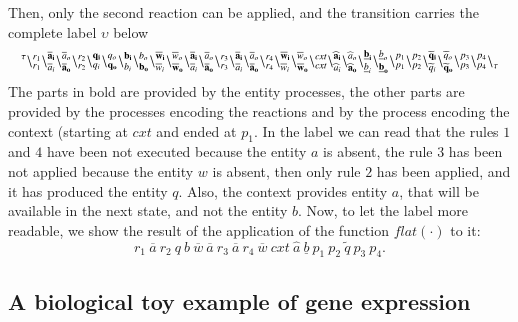 Then, only the second reaction can be applied, and the transition carries the complete label $\upsilon$ below
{\tiny
\[
 {}^{\tau}
 \backslash_{r_1}^{r_1}
 \backslash_{\overline{a}_i}^{\bf  \overline{a}_i}\backslash_{\bf \overline{a}_o}^{\overline{a}_o}
 \backslash_{r_2}^{r_2}
 \backslash_{q_i}^{\bf q_i}\backslash_{\bf q_o}^{q_o}
 \backslash_{b_i}^{\bf b_i}\backslash_{\bf b_o}^{b_o}
 \backslash_{\overline{w}_i}^{\bf \overline{w}_i}\backslash_{\bf \overline{w}_o}^{\overline{w}_o}
 \backslash_{\overline{a}_i}^{\bf \overline{a}_i}\backslash_{\bf \overline{a}_o}^{\overline{a}_o}
 \backslash_{r_3}^{r_3}
 \backslash_{\overline{a}_i}^{\bf \overline{a}_i}\backslash_{\bf \overline{a}_o}^{\overline{a}_o}
 \backslash_{r_4}^{r_4}
 \backslash_{\overline{w}_i}^{\bf \overline{w}_i}\backslash_{\bf \overline{w}_o}^{\overline{w}_o}
 \backslash_{\mathit{cxt}}^{\mathit{cxt}}
 \backslash_{\widehat{a}_i}^{\bf \widehat{a}_i}\backslash_{\bf \widehat{a}_o}^{\widehat{a}_o}
 \backslash_{\underline{b}_i}^{\bf \underline{b}_i}\backslash_{\bf \underline{b}_o}^{\underline{b}_o}
 \backslash_{p_1}^{p_1}
 \backslash_{p_2}^{p_2}
 \backslash_{\widetilde{q}_i}^{\bf \widetilde{q}_i}\backslash_{\bf \widetilde{q}_o}^{\widetilde{q}_o}
 \backslash_{p_3}^{p_3}
 \backslash_{p_4}^{p_4}
 \backslash_{\tau}^{}
\]}
The parts in bold are provided by the entity processes, the other parts are provided by the processes encoding the reactions and by the process encoding the context (starting at $\mathit{cxt}$ and ended at $p_1$.
In the label we can read that the rules $1$ and $4$ have been not executed because the entity $a$ is absent, 
the rule $3$ has been not applied because the entity $w$ is absent, then only rule $2$ has been applied, and it has produced the entity $q$. Also,  the context provides entity $a$, that will be available in the next state, and not the entity $b$.
Now, to let the label more readable, we show the result of the application of the function $flat(\cdot)$ to it:
\[
r_1~\overline{a}~r_2~q~b~\overline{w}~\overline{a}~r_3~\overline{a}~r_4~\overline{w}~\mathit{cxt}~\widehat{a}~\underline{b}~p_1~p_2~\widetilde{q}~p_3~p_4 .
\]


\subsection{A  biological toy example of gene expression}\label{subsec:toy}

